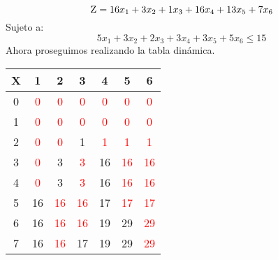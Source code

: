 \documentclass[10pt,letterpaper]{article}
\begin{document}
\[ \textsc{\normalsize Z}\\[0.5cm] = 16x_{1}+3x_{2}+1x_{3}+16x_{4}+13x_{5}+7x_{6} \]
Sujeto a: 
\[ 5x_{1}+3x_{2}+2x_{3}+3x_{4}+3x_{5}+5x_{6} \leq 15 \]
\newline Ahora proseguimos realizando la tabla dinámica.
\begin{center}
\begin{tabu} to 1.0\textwidth { | c | c | c | c | c | c | c | }
\hline
{}\color{black}\textbf{X} & \color{black}\textbf{1} & \color{black}\textbf{2} & \color{black}\textbf{3} & \color{black}\textbf{4} & \color{black}\textbf{5} & \color{black}\textbf{6} \\ 
\hline
{}\color{black}0 & \textcolor{red}{ 0} & \textcolor{red}{ 0} & \textcolor{red}{ 0} & \textcolor{red}{ 0} & \textcolor{red}{ 0} & \textcolor{red}{ 0} \\ 
\hline
{}\color{black}1 & \textcolor{red}{ 0} & \textcolor{red}{ 0} & \textcolor{red}{ 0} & \textcolor{red}{ 0} & \textcolor{red}{ 0} & \textcolor{red}{ 0} \\ 
\hline
{}\color{black}2 & \textcolor{red}{ 0} & \textcolor{red}{ 0} & \textcolor{GreenBlack}{ 1} & \textcolor{red}{ 1} & \textcolor{red}{ 1} & \textcolor{red}{ 1} \\ 
\hline
{}\color{black}3 & \textcolor{red}{ 0} & \textcolor{GreenBlack}{ 3} & \textcolor{red}{ 3} & \textcolor{GreenBlack}{ 16} & \textcolor{red}{ 16} & \textcolor{red}{ 16} \\ 
\hline
{}\color{black}4 & \textcolor{red}{ 0} & \textcolor{GreenBlack}{ 3} & \textcolor{red}{ 3} & \textcolor{GreenBlack}{ 16} & \textcolor{red}{ 16} & \textcolor{red}{ 16} \\ 
\hline
{}\color{black}5 & \textcolor{GreenBlack}{ 16} & \textcolor{red}{ 16} & \textcolor{red}{ 16} & \textcolor{GreenBlack}{ 17} & \textcolor{red}{ 17} & \textcolor{red}{ 17} \\ 
\hline
{}\color{black}6 & \textcolor{GreenBlack}{ 16} & \textcolor{red}{ 16} & \textcolor{red}{ 16} & \textcolor{GreenBlack}{ 19} & \textcolor{GreenBlack}{ 29} & \textcolor{red}{ 29} \\ 
\hline
{}\color{black}7 & \textcolor{GreenBlack}{ 16} & \textcolor{red}{ 16} & \textcolor{GreenBlack}{ 17} & \textcolor{GreenBlack}{ 19} & \textcolor{GreenBlack}{ 29} & \textcolor{red}{ 29} \\ 

\end{tabu}
\end{center}
\end{document}
